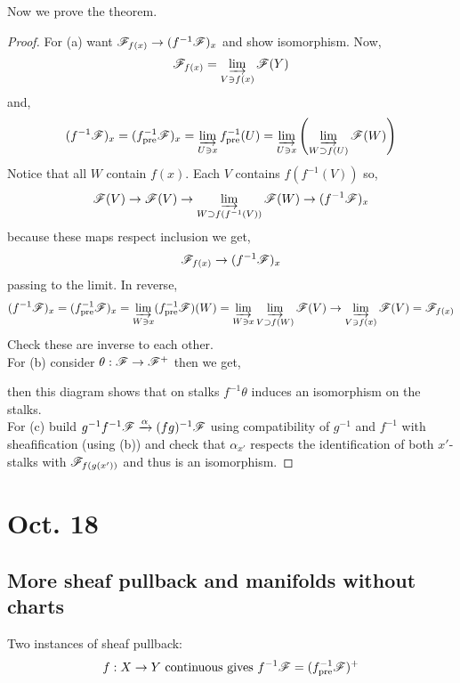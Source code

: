\documentclass[12pt]{article}
\begin{document}
\noindent 
Now we prove the theorem.

\begin{proof}
For (a) want $\mathscr{F}_{f(x)} \to (f^{-1} \mathscr{F})_x$ and show isomorphism. Now,
\[ \mathscr{F}_{f(x)} = \varinjlim_{V \ni f(x)} \mathscr{F}(Y) \]
and,
\[ (f^{-1} \mathscr{F})_x = (f^{-1}_{\text{pre}} \mathscr{F})_x = \varinjlim_{U \ni x} f^{-1}_{\text{pre}}(U) = \varinjlim_{U \ni x} \left( \varinjlim_{W \supset f(U)} \mathscr{F}(W) \right) \]
Notice that all $W$ contain $f(x)$. Each $V$ contains $f(f^{-1}(V))$ so,
\[ \mathscr{F}(V) \to \mathscr{F}(V) \to \varinjlim_{W \supset f(f^{-1}(V))} \mathscr{F}(W) \to (f^{-1} \mathscr{F})_x \]
because these maps respect inclusion we get,
\[ \mathscr{F}_{f(x)} \to (f^{-1} \mathscr{F})_x \]
passing to the limit. In reverse,
\[ (f^{-1} \mathscr{F})_x = (f^{-1}_{\text{pre}} \mathscr{F})_x = \varinjlim_{W \ni x} (f^{-1}_{\text{pre}} \mathscr{F})(W) = \varinjlim_{W \ni x} \varinjlim_{V \supset f(W)} \mathscr{F}(V) \to \varinjlim_{V \ni f(x)} \mathscr{F}(V) = \mathscr{F}_{f(x)} \]
Check these are inverse to each other.
\bigskip\\
For (b) consider $\theta : \mathscr{F} \to \mathscr{F}^+$ then we get,
\begin{center}
\end{center}
then this diagram shows that on stalks $f^{-1} \theta$ induces an isomorphism on the stalks. 
\bigskip\\
For (c) build $g^{-1} f^{-1} \mathscr{F} \xrightarrow{\alpha} (fg)^{-1} \mathscr{F}$ using compatibility of $g^{-1}$ and $f^{-1}$ with sheafification (using (b)) and check that $\alpha_{x'}$ respects the identification of  both $x'$-stalks with $\mathscr{F}_{f(g(x'))}$ and thus is an isomorphism.
\end{proof}

\section{Oct. 18}

\subsection{More sheaf pullback and manifolds without charts}

Two instances of sheaf pullback:
\[ f : X \to Y \text{ continuous gives } f^{-1} \mathscr{F} = (f^{-1}_{\text{pre}} \mathscr{F})^+ \]
\end{document}
